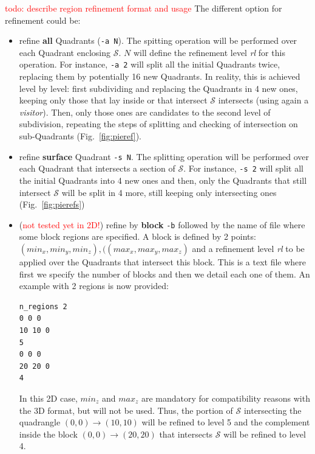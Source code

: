 \documentclass[10pt]{article}
\begin{document}
\textcolor{red}{todo: describe region refinement format and usage}
The different option for refinement could be:
\begin{itemize}
\item refine \textbf{all} Quadrants (\texttt{-a N}). The spitting operation will be performed over each Quadrant enclosing $\mathcal{S}$. $N$ will define the refinement level \textit{rl} for this operation. For instance, \texttt{-a 2} will split all the initial Quadrants twice, replacing them by potentially 16 new Quadrants. In reality, this is achieved level by level: first subdividing and replacing the Quadrants in 4 new ones, keeping only those that lay inside or that intersect $\mathcal{S}$ intersects (using again a \textit{visitor}). Then, only those ones are candidates to the second level of subdivision, repeating the steps of splitting and checking of intersection on sub-Quadrants (Fig.~\ref{fig:pieref}). 
\item refine \textbf{surface} Quadrant \texttt{-s N}. The  splitting  operation  will  be  performed  over  each Quadrant  that  intersects  a  section  of $\mathcal{S}$.  For  instance, \texttt{-s  2} will  split  all  the  initial  Quadrants into  4  new  ones  and  then,  only  the  Quadrants  that  still  intersect $\mathcal{S}$ will  be  split  in 4  more, still keeping only intersecting ones (Fig.~\ref{fig:pierefs})
\item (\textcolor{red}{not tested yet in 2D!}) refine by \textbf{block} \texttt{-b} followed by the name of file where some block regions are specified. A block is defined by 2 points: $(min_x, min_y,min_z), ((max_x, max_y,max_z)$ and a refinement level \textit{rl} to be applied over the Quadrants that intersect this block. This is a text file where first we specify the number of blocks and then we detail each one of them. An example with 2 regions is now provided:\\
%
\begin{minipage}{0.2\textwidth}
\begin{verbatim}
n_regions 2
0 0 0
10 10 0
5
0 0 0
20 20 0
4
\end{verbatim}
\end{minipage}
\hfill
\begin{minipage}[c]{0.65\textwidth}
In this 2D case, $min_z$ and $max_z$ are mandatory for compatibility reasons with the 3D format, but will not be used. Thus, the portion of $\mathcal{S}$ intersecting the quadrangle $(0,0) \to (10,10)$ will be refined to level 5 and the complement inside the block $(0,0) \to (20,20)$ that intersects $\mathcal{S}$ will be refined to level 4.\\[0.2cm]

\end{minipage}
\end{itemize}
\end{document}
